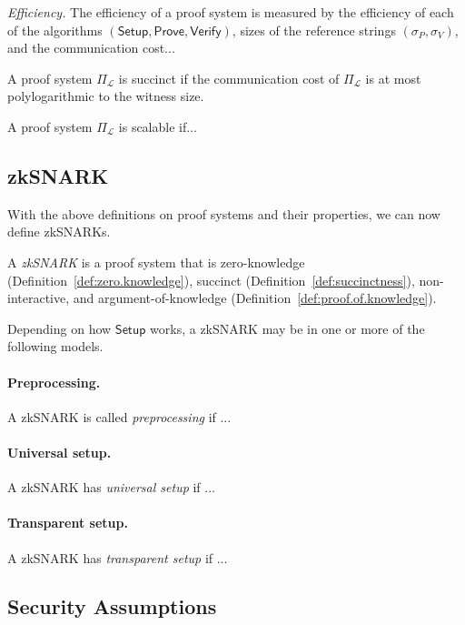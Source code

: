 \documentclass[acmtog]{acmart}
\newcommand{\cL}{\mathcal{L}}
\newcommand{\Setup}{\mathsf{Setup}}
\newcommand{\Prove}{\mathsf{Prove}}
\newcommand{\Verify}{\mathsf{Verify}}
\newcommand{\PiL}{\Pi_{\cL}}
\begin{document}
\emph{Efficiency.} The efficiency of a proof system is measured by the efficiency of each of the algorithms $(\Setup,\Prove,\Verify)$, sizes of the reference strings $(\sigma_P,\sigma_V)$, and the communication cost...

\begin{definition}[Succinctness]
\label{def:succinctness}
A proof system $\PiL$ is succinct if the communication cost of $\PiL$ is at most polylogarithmic to the witness size.
\end{definition}

\begin{definition}[Scalability]
\label{def:scalability}
A proof system $\PiL$ is scalable if...
\end{definition}

\subsection{zkSNARK}

With the above definitions on proof systems and their properties, we can now define zkSNARKs.

\begin{definition}[zkSNARK]
A \emph{zkSNARK} is a proof system that is zero-knowledge (Definition~\ref{def:zero.knowledge}), succinct (Definition~\ref{def:succinctness}), non-interactive, and argument-of-knowledge (Definition~\ref{def:proof.of.knowledge}).
\end{definition}

Depending on how $\Setup$ works, a zkSNARK may be in one or more of the following models.

\paragraph{Preprocessing.} A zkSNARK is called \emph{preprocessing} if ...

\paragraph{Universal setup.} A zkSNARK has \emph{universal setup} if ...

\paragraph{Transparent setup.} A zkSNARK has \emph{transparent setup} if ...

\subsection{Security Assumptions}
\end{document}
